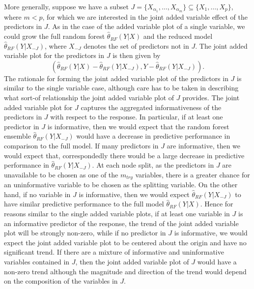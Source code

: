 \documentclass[12pt,twoside]{reedthesis}
\theoremstyle{definition}
\theoremstyle{definition}
\theoremstyle{definition}
\theoremstyle{remark}
\begin{document}
More generally, suppose we have a subset
\(J=\{X_{\alpha_1},\ldots, X_{\alpha_m}\}\subseteq \{X_1,\ldots,X_p\}\),
where \(m< p\), for which we are interested in the joint added variable
effect of the predictors in \(J\). As in the case of the added variable
plot of a single variable, we could grow the full random forest
\(\hat{\theta}_{RF}(Y|X)\) and the reduced model
\(\hat{\theta}_{RF}(Y|X_{-J})\), where \(X_{-J}\) denotes the set of
predictors not in \(J\). The joint added variable plot for the
predictors in \(J\) is then given by
\[(\hat{\theta}_{RF}(Y|X)-\hat{\theta}_{RF}(Y|X_{-J}), Y-\hat{\theta}_{RF}(Y|X_{-J})).\]
The rationale for forming the joint added variable plot of the
predictors in \(J\) is similar to the single variable case, although
care has to be taken in describing what sort-of relationship the joint
added variable plot of \(J\) provides. The joint added variable plot for
\(J\) captures the aggregated informativeness of the predictors in \(J\)
with respect to the response. In particular, if at least one predictor
in \(J\) is informative, then we would expect that the random forest
ensemble \(\hat{\theta}_{RF}(Y|X_{-J})\) would have a decrease in
predictive performance in comparison to the full model. If many
predictors in \(J\) are informative, then we would expect that,
correspondedly there would be a large decrease in predictive performance
in \(\hat{\theta}_{RF}(Y|X_{-J})\). At each node split, as the
predictors in \(J\) are unavailable to be chosen as one of the
\(m_{try}\) variables, there is a greater chance for an uninformative
variable to be chosen as the splitting variable. On the other hand, if
no variable in \(J\) is informative, then we would expect
\(\hat{\theta}_{RF}(Y|X_{-J})\) to have similar predictive performance
to the full model \(\hat{\theta}_{RF}(Y|X)\). Hence for reasons similar
to the single added variable plots, if at least one variable in \(J\) is
an informative predictor of the response, the trend of the joint added
variable plot will be strongly non-zero, while if no predictor in \(J\)
is informative, we would expect the joint added variable plot to be
centered about the origin and have no significant trend. If there are a
mixture of informative and uninformative variables contained in \(J\),
then the joint added variable plot of \(J\) would have a non-zero trend
although the magnitude and direction of the trend would depend on the
composition of the variables in \(J\).
\end{document}
